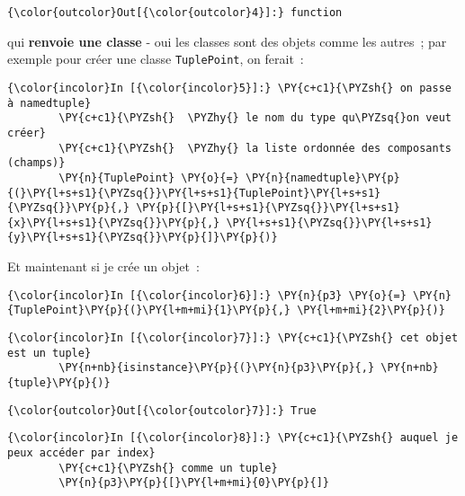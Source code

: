 \begin{Verbatim}[commandchars=\\\{\}]
{\color{outcolor}Out[{\color{outcolor}4}]:} function
\end{Verbatim}
            
    qui \textbf{renvoie une classe} - oui les classes sont des objets comme
les autres~; par exemple pour créer une classe \texttt{TuplePoint}, on
ferait~:

    \begin{Verbatim}[commandchars=\\\{\}]
{\color{incolor}In [{\color{incolor}5}]:} \PY{c+c1}{\PYZsh{} on passe à namedtuple}
        \PY{c+c1}{\PYZsh{}  \PYZhy{} le nom du type qu\PYZsq{}on veut créer}
        \PY{c+c1}{\PYZsh{}  \PYZhy{} la liste ordonnée des composants (champs)}
        \PY{n}{TuplePoint} \PY{o}{=} \PY{n}{namedtuple}\PY{p}{(}\PY{l+s+s1}{\PYZsq{}}\PY{l+s+s1}{TuplePoint}\PY{l+s+s1}{\PYZsq{}}\PY{p}{,} \PY{p}{[}\PY{l+s+s1}{\PYZsq{}}\PY{l+s+s1}{x}\PY{l+s+s1}{\PYZsq{}}\PY{p}{,} \PY{l+s+s1}{\PYZsq{}}\PY{l+s+s1}{y}\PY{l+s+s1}{\PYZsq{}}\PY{p}{]}\PY{p}{)}
\end{Verbatim}


    Et maintenant si je crée un objet~:

    \begin{Verbatim}[commandchars=\\\{\}]
{\color{incolor}In [{\color{incolor}6}]:} \PY{n}{p3} \PY{o}{=} \PY{n}{TuplePoint}\PY{p}{(}\PY{l+m+mi}{1}\PY{p}{,} \PY{l+m+mi}{2}\PY{p}{)}
\end{Verbatim}


    \begin{Verbatim}[commandchars=\\\{\}]
{\color{incolor}In [{\color{incolor}7}]:} \PY{c+c1}{\PYZsh{} cet objet est un tuple}
        \PY{n+nb}{isinstance}\PY{p}{(}\PY{n}{p3}\PY{p}{,} \PY{n+nb}{tuple}\PY{p}{)}
\end{Verbatim}


\begin{Verbatim}[commandchars=\\\{\}]
{\color{outcolor}Out[{\color{outcolor}7}]:} True
\end{Verbatim}
            
    \begin{Verbatim}[commandchars=\\\{\}]
{\color{incolor}In [{\color{incolor}8}]:} \PY{c+c1}{\PYZsh{} auquel je peux accéder par index}
        \PY{c+c1}{\PYZsh{} comme un tuple}
        \PY{n}{p3}\PY{p}{[}\PY{l+m+mi}{0}\PY{p}{]}
\end{Verbatim}


